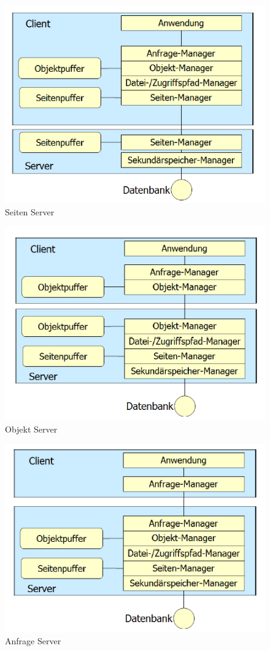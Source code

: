 \begin{figure}[!h]
	\centering
	\includegraphics[scale=0.6]{img/seiten_server.png}
	\caption{Seiten Server}
\end{figure}

\begin{figure}[!h]
	\centering
	\includegraphics[scale=0.6]{img/object_server.png}
	\caption{Objekt Server}
\end{figure}

\begin{figure}[!h]
	\centering
	\includegraphics[scale=0.6]{img/anfrage_server.png}
	\caption{Anfrage Server}
\end{figure}

